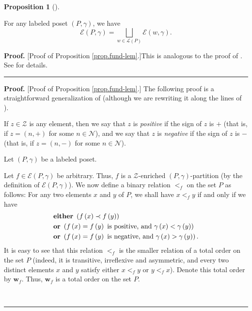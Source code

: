 \documentclass[numbers=enddot,12pt,final,onecolumn,notitlepage]{scrartcl}%
\theoremstyle{definition}
\newtheorem{prop}[theo]{Proposition}
\newenvironment{proposition}[1][]
{\begin{prop}[#1]\begin{leftbar}}
{\end{leftbar}\end{prop}}
\newenvironment{proof}[1][Proof]{\noindent\textbf{#1.} }{\ \rule{0.5em}{0.5em}}
\newenvironment{verlong}{}{}
\newenvironment{vershort}{}{}
\begin{document}
\begin{proposition}
\label{prop.fund-lem}For any labeled poset $\left(  P,\gamma\right)  $, we
have%
\[
\mathcal{E}\left(  P,\gamma\right)  =\bigsqcup_{w\in\mathcal{L}\left(
P\right)  }\mathcal{E}\left(  w,\gamma\right)  .
\]

\end{proposition}

\begin{vershort}
\begin{proof}
[Proof of Proposition \ref{prop.fund-lem}.]This is analogous to the proof of
\cite[Lemma 2.1]{Stembr97}.
See \cite{verlong} for details.
\end{proof}
\end{vershort}

\begin{verlong}
\begin{proof}
[Proof of Proposition \ref{prop.fund-lem}.] The following proof is a
straightforward generalization of \cite[proof of Lemma 2.1]{Stembr97}
(although we are
rewriting it along the lines of \cite[solution to Exercise 5.2.13]{HopfComb}).

If $z\in\mathcal{Z}$ is any element, then we say that $z$ is \textit{positive}
if the sign of $z$ is $+$ (that is, if $z=\left(  n,+\right)  $ for some
$n\in\mathcal{N}$), and we say that $z$ is \textit{negative} if the sign of
$z$ is $-$ (that is, if $z=\left(  n,-\right)  $ for some $n\in\mathcal{N}$).

Let $\left(P, \gamma\right)$ be a labeled poset.

Let $f\in\mathcal{E}\left(  P,\gamma\right)  $ be arbitrary. Thus, $f$ is a
$\mathcal{Z}$-enriched $\left(  P,\gamma\right)  $-partition (by the
definition of $\mathcal{E}\left(  P,\gamma\right)  $). We now define a binary
relation $<_{f}$ on the set $P$ as follows: For any two elements $x$ and $y$
of $P$, we shall have $x<_{f}y$ if and only if we have%
\begin{align*}
& \text{\textbf{either} }\left(  f\left(  x\right)  \prec f\left(  y\right)
\right)  \\
& \text{\textbf{or} }\left(  f\left(  x\right)  =f\left(  y\right)  \text{ is
positive, and }\gamma\left(  x\right)  <\gamma\left(  y\right)  \right)  \\
& \text{\textbf{or} }\left(  f\left(  x\right)  =f\left(  y\right)  \text{ is
negative, and }\gamma\left(  x\right)  >\gamma\left(  y\right)  \right)
\text{.}%
\end{align*}
It is easy to see that this relation $<_{f}$ is the smaller relation of a
total order on the set $P$
(indeed, it is transitive, irreflexive and asymmetric, and
every two distinct elements $x$ and $y$ satisfy either $x<_{f}y$ or
$y<_{f}x$).
Denote this total order by $\mathbf{w}_{f}$. Thus, $\mathbf{w}_{f}$ is a
total order on the set $P$.


\end{proof}
\end{verlong}
\end{document}
